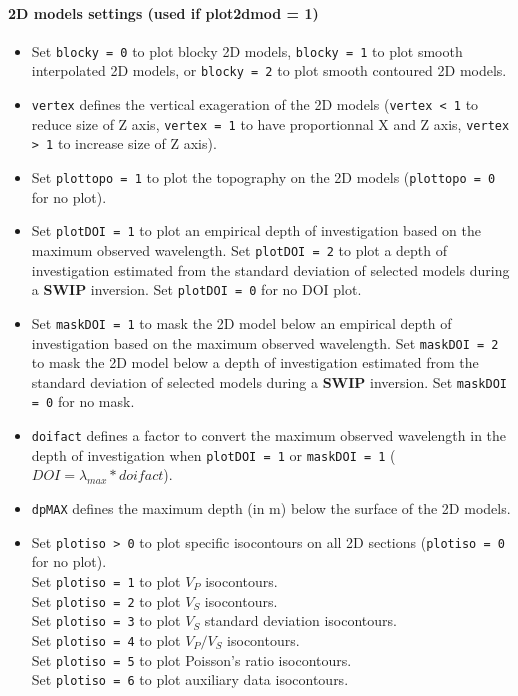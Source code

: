 \documentclass[twoside,a4paper]{article}
\def\SWIP{\textbf{SWIP}}
\begin{document}
\paragraph{2D models settings (used if plot2dmod = 1)}
\begin{itemize}[leftmargin=*]
\setlength\itemsep{2ex}
\item Set \verb|blocky = 0| to plot blocky 2D models, \verb|blocky = 1| to plot smooth interpolated 2D models, or \verb|blocky = 2| to plot smooth contoured 2D models.

\item \verb|vertex| defines the vertical exageration of the 2D models (\verb|vertex < 1| to reduce size of Z axis, \verb|vertex = 1| to have proportionnal X and Z axis, \verb|vertex > 1| to increase size of Z axis).

\item Set \verb|plottopo = 1| to plot the topography on the 2D models (\verb|plottopo = 0| for no plot).

\item Set \verb|plotDOI = 1| to plot an empirical depth of investigation based on the maximum observed wavelength. Set \verb|plotDOI = 2| to plot a depth of investigation estimated from the standard deviation of selected models during a {\SWIP} inversion. Set \verb|plotDOI = 0| for no DOI plot.

\item Set \verb|maskDOI = 1| to mask the 2D model below an empirical depth of investigation based on the maximum observed wavelength. Set \verb|maskDOI = 2| to mask the 2D model below a depth of investigation estimated from the standard deviation of selected models during a {\SWIP} inversion. Set \verb|maskDOI = 0| for no mask.

\item \verb|doifact| defines a factor to convert the maximum observed wavelength in the depth of investigation when \verb|plotDOI = 1| or \verb|maskDOI = 1| ($DOI = \lambda_{max}*doifact$).

\item \verb|dpMAX| defines the maximum depth (in m) below the surface of the 2D models.

\item Set \verb|plotiso > 0| to plot specific isocontours on all 2D sections (\verb|plotiso = 0| for no plot).\\[1ex]
Set \verb|plotiso = 1| to plot $V_P$ isocontours.\\[1ex]
Set \verb|plotiso = 2| to plot $V_S$ isocontours.\\[1ex]
Set \verb|plotiso = 3| to plot $V_S$ standard deviation isocontours.\\[1ex]
Set \verb|plotiso = 4| to plot $V_P/V_S$ isocontours.\\[1ex]
Set \verb|plotiso = 5| to plot Poisson's ratio isocontours.\\[1ex]
Set \verb|plotiso = 6| to plot auxiliary data isocontours.


\end{itemize}
\end{document}
